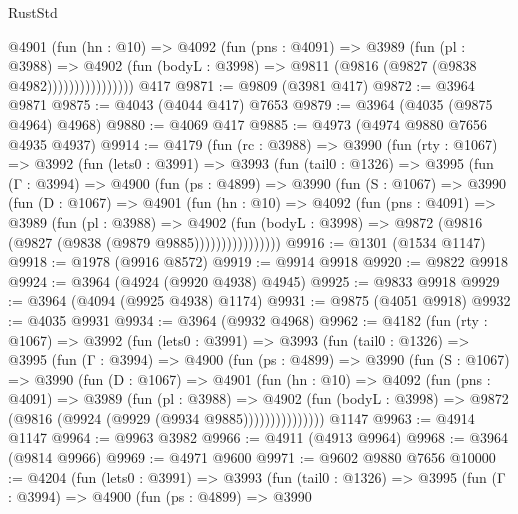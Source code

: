 \begin{lexlean}{RustStd}
\begin{coremodule}
{\begin{coremodule}
{{{{{{{{{{{{{{{{{{{{{{{{{{{{{{{{{{{{{{                    @4901
                      (fun (hn : @10) =>
                      @4092
                        (fun (pns : @4091) =>
                        @3989
                          (fun (pl : @3988) =>
                          @4902
                            (fun (bodyL : @3998) => @9811 (@9816 (@9827 (@9838 @4982))))))))))))))))
    @417
@9871 := @9809 (@3981 @417)
@9872 := @3964 @9871
@9875 := @4043 (@4044 @417) @7653
@9879 := @3964 (@4035 (@9875 @4964) @4968)
@9880 := @4069 @417
@9885 := @4973 (@4974 @9880 @7656 @4935 @4937)
@9914 := @4179
    (fun (rc : @3988) =>
    @3990
      (fun (rty : @1067) =>
      @3992
        (fun (lets0 : @3991) =>
        @3993
          (fun (tail0 : @1326) =>
          @3995
            (fun (Γ : @3994) =>
            @4900
              (fun (ps : @4899) =>
              @3990
                (fun (S : @1067) =>
                @3990
                  (fun (D : @1067) =>
                  @4901
                    (fun (hn : @10) =>
                    @4092
                      (fun (pns : @4091) =>
                      @3989
                        (fun (pl : @3988) =>
                        @4902
                          (fun (bodyL : @3998) =>
                          @9872 (@9816 (@9827 (@9838 (@9879 @9885))))))))))))))))
@9916 := @1301 (@1534 @1147)
@9918 := @1978 (@9916 @8572)
@9919 := @9914 @9918
@9920 := @9822 @9918
@9924 := @3964 (@4924 (@9920 @4938) @4945)
@9925 := @9833 @9918
@9929 := @3964 (@4094 (@9925 @4938) @1174)
@9931 := @9875 (@4051 @9918)
@9932 := @4035 @9931
@9934 := @3964 (@9932 @4968)
@9962 := @4182
    (fun (rty : @1067) =>
    @3992
      (fun (lets0 : @3991) =>
      @3993
        (fun (tail0 : @1326) =>
        @3995
          (fun (Γ : @3994) =>
          @4900
            (fun (ps : @4899) =>
            @3990
              (fun (S : @1067) =>
              @3990
                (fun (D : @1067) =>
                @4901
                  (fun (hn : @10) =>
                  @4092
                    (fun (pns : @4091) =>
                    @3989
                      (fun (pl : @3988) =>
                      @4902
                        (fun (bodyL : @3998) =>
                        @9872 (@9816 (@9924 (@9929 (@9934 @9885)))))))))))))))
    @1147
@9963 := @4914 @1147
@9964 := @9963 @3982
@9966 := @4911 (@4913 @9964)
@9968 := @3964 (@9814 @9966)
@9969 := @4971 @9600
@9971 := @9602 @9880 @7656
@10000 := @4204
    (fun (lets0 : @3991) =>
    @3993
      (fun (tail0 : @1326) =>
      @3995
        (fun (Γ : @3994) =>
        @4900
          (fun (ps : @4899) =>
          @3990
}}}}}}}}}}}}}}}}}}}}}}}}}}}}}}}}}}}}}}
\end{coremodule}}
\end{coremodule}
\end{lexlean}

